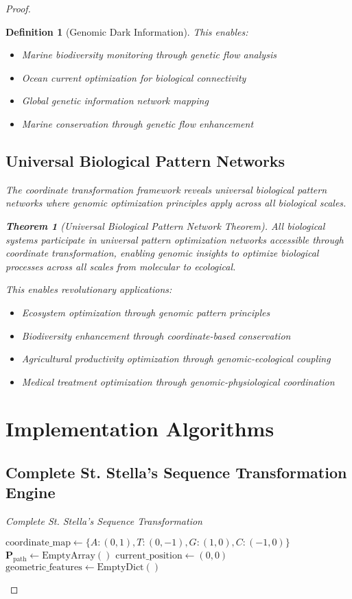 \documentclass[12pt,a4paper]{article}
\newtheorem{theorem}{Theorem}
\newtheorem{definition}{Definition}
\begin{document}
\begin{proof}
\begin{definition}[Genomic Dark Information]
This enables:
\begin{itemize}
\item Marine biodiversity monitoring through genetic flow analysis
\item Ocean current optimization for biological connectivity
\item Global genetic information network mapping
\item Marine conservation through genetic flow enhancement
\end{itemize}

\subsection{Universal Biological Pattern Networks}

The coordinate transformation framework reveals universal biological pattern networks where genomic optimization principles apply across all biological scales.

\begin{theorem}[Universal Biological Pattern Network Theorem]
All biological systems participate in universal pattern optimization networks accessible through coordinate transformation, enabling genomic insights to optimize biological processes across all scales from molecular to ecological.
\end{theorem}

This enables revolutionary applications:
\begin{itemize}
\item Ecosystem optimization through genomic pattern principles
\item Biodiversity enhancement through coordinate-based conservation
\item Agricultural productivity optimization through genomic-ecological coupling
\item Medical treatment optimization through genomic-physiological coordination
\end{itemize}
\section{Implementation Algorithms}

\subsection{Complete St. Stella's Sequence Transformation Engine}

\begin{algorithm}[H]
\caption{Complete St. Stella's Sequence Transformation}
\label{alg:stellas_sequence_complete}
\begin{algorithmic}[1]
    \State $\text{coordinate\_map} \gets \{A: (0,1), T: (0,-1), G: (1,0), C: (-1,0)\}$
    \State $\mathbf{P}_{\text{path}} \gets \text{EmptyArray}()$
    \State $\text{current\_position} \gets (0, 0)$
    \State $\text{geometric\_features} \gets \text{EmptyDict}()$
    

\end{algorithmic}
\end{algorithm}
\end{definition}
\end{proof}
\end{document}
